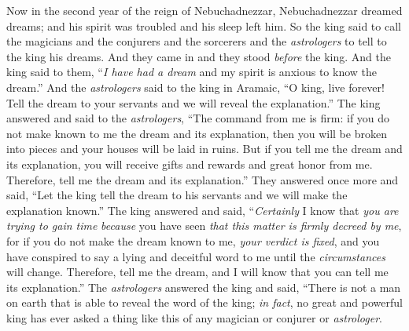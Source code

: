 \begin{biblechapter} %
 Now in the second year of the reign of Nebuchadnezzar, Nebuchadnezzar dreamed dreams; and his spirit was troubled and his sleep left him.
\verse So the king said to call the magicians and the conjurers and the sorcerers and the \textit{astrologers} to tell to the king his dreams. And they came in and they stood \textit{before} the king.
\verse And the king said to them, “\textit{I have had a dream} and my spirit is anxious to know the dream.”
\verse And the \textit{astrologers} said to the king in Aramaic, “O king, live forever! Tell the dream to your servants and we will reveal the explanation.”
\verse The king answered and said to the \textit{astrologers}, “The command from me is firm: if you do not make known to me the dream and its explanation, then you will be broken into pieces and your houses will be laid in ruins.
\verse But if you tell me the dream and its explanation, you will receive gifts and rewards and great honor from me. Therefore, tell me the dream and its explanation.”
\verse They answered once more and said, “Let the king tell the dream to his servants and we will make the explanation known.”
\verse The king answered and said, “\textit{Certainly} I know that \textit{you are trying to gain time} \textit{because} you have seen \textit{that this matter is firmly decreed by me},
\verse for if you do not make the dream known to me, \textit{your verdict is fixed}, and you have conspired to say a lying and deceitful word to me until the \textit{circumstances} will change. Therefore, tell me the dream, and I will know that you can tell me its explanation.”
\verse The \textit{astrologers} answered the king and said, “There is not a man on earth that is able to reveal the word of the king; \textit{in fact}, no great and powerful king has ever asked a thing like this of any magician or conjurer or \textit{astrologer}.

\end{biblechapter}
